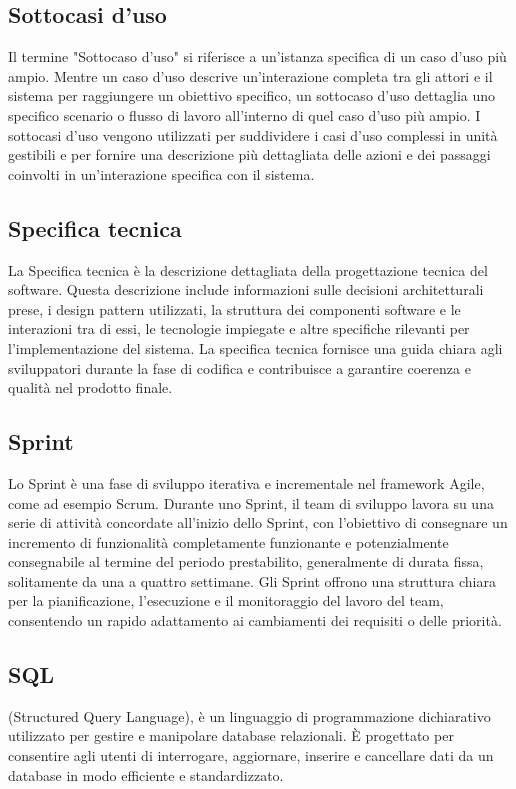\subsection*{Sottocasi d'uso} 
Il termine "Sottocaso d'uso" si riferisce a un'istanza specifica di un caso d'uso più ampio. Mentre un caso d'uso descrive un'interazione completa tra gli attori e il sistema per raggiungere un obiettivo specifico, un sottocaso d'uso dettaglia uno specifico scenario o flusso di lavoro all'interno di quel caso d'uso più ampio. I sottocasi d'uso vengono utilizzati per suddividere i casi d'uso complessi in unità gestibili e per fornire una descrizione più dettagliata delle azioni e dei passaggi coinvolti in un'interazione specifica con il sistema. 
\subsection*{Specifica tecnica} 
La Specifica tecnica è la descrizione dettagliata della progettazione tecnica del software. Questa descrizione include informazioni sulle decisioni architetturali prese, i design pattern utilizzati, la struttura dei componenti software e le interazioni tra di essi, le tecnologie impiegate e altre specifiche rilevanti per l'implementazione del sistema. La specifica tecnica fornisce una guida chiara agli sviluppatori durante la fase di codifica e contribuisce a garantire coerenza e qualità nel prodotto finale. 
\subsection*{Sprint} 
Lo Sprint è una fase di sviluppo iterativa e incrementale nel framework Agile, come ad esempio Scrum. Durante uno Sprint, il team di sviluppo lavora su una serie di attività concordate all'inizio dello Sprint, con l'obiettivo di consegnare un incremento di funzionalità completamente funzionante e potenzialmente consegnabile al termine del periodo prestabilito, generalmente di durata fissa, solitamente da una a quattro settimane. Gli Sprint offrono una struttura chiara per la pianificazione, l'esecuzione e il monitoraggio del lavoro del team, consentendo un rapido adattamento ai cambiamenti dei requisiti o delle priorità. 
\subsection*{SQL} 
(Structured Query Language), è un linguaggio di programmazione dichiarativo utilizzato per gestire e manipolare database relazionali. È progettato per consentire agli utenti di interrogare, aggiornare, inserire e cancellare dati da un database in modo efficiente e standardizzato.

